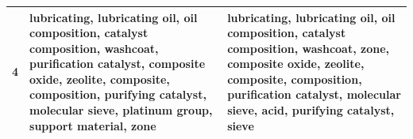 \begin{table}[htbp]
\begin{tabular}{|r|p{17em}|p{17em}|}
    \midrule
    4 & \textbf{lubricating}, \textbf{lubricating} \textbf{oil}, \textbf{oil} \textbf{composition}, \textbf{catalyst} \textbf{composition}, \textbf{washcoat}, \textbf{purification} \textbf{catalyst}, \textbf{composite} \textbf{oxide}, \textbf{zeolite}, \textbf{composite}, \textbf{composition}, \textbf{purifying} \textbf{catalyst}, \textbf{molecular} \textbf{sieve}, platinum group, support material, \textbf{zone} & \textbf{lubricating}, \textbf{lubricating} \textbf{oil}, \textbf{oil} \textbf{composition}, \textbf{catalyst} \textbf{composition}, \textbf{washcoat}, \textbf{zone}, \textbf{composite} \textbf{oxide}, \textbf{zeolite}, \textbf{composite}, \textbf{composition}, \textbf{purification} \textbf{catalyst}, \textbf{molecular} \textbf{sieve}, acid, \textbf{purifying} \textbf{catalyst}, sieve \\
    \bottomrule
    \end{tabular}%
  \label{tab:addlabel}%
\end{table}%

